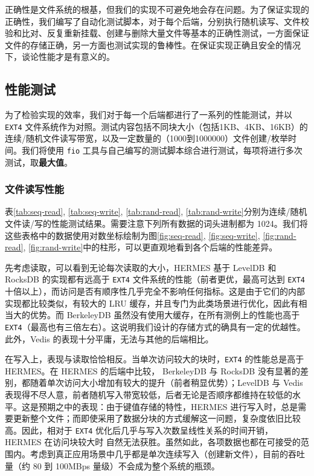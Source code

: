 \documentclass{ctexart}
\begin{document}
正确性是文件系统的根基，但我们的实现不可避免地会存在问题。为了保证实现的正确性，我们编写了自动化测试脚本，对于每个后端，分别执行随机读写、文件校验和比对、反复重新挂载、创建与删除大量文件等基本的正确性测试，一方面保证文件的存储正确，另一方面也测试实现的鲁棒性。在保证实现正确且安全的情况下，谈论性能才是有意义的。

\subsection{性能测试}

为了检验实现的效率，我们对于每一个后端都进行了一系列的性能测试，并以 \texttt{EXT4} 文件系统作为对照。测试内容包括不同块大小（包括1KB、4KB、16KB）的连续/随机文件读写带宽，以及一定数量的（1000到1000000）文件创建/枚举时间。我们将使用 \texttt{fio} 工具与自己编写的测试脚本综合进行测试，每项将进行多次测试，取\textbf{最大值}。

\subsubsection{文件读写性能}

表\ref{tab:seq-read}, \ref{tab:seq-write}, \ref{tab:rand-read}, \ref{tab:rand-write}分别为连续/随机文件读/写的性能测试结果。需要注意下列所有数据的词头进制都为 1024。我们将这些表格中的数据使用对数坐标绘制为图\ref{fig:seq-read}, \ref{fig:seq-write}, \ref{fig:rand-read}, \ref{fig:rand-write}中的柱形，可以更直观地看到各个后端的性能差异。

先考虑读取，可以看到无论每次读取的大小，HERMES 基于 LevelDB 和 RocksDB 的实现都有远高于 \texttt{EXT4} 文件系统的性能（前者更优，最高可达到 \texttt{EXT4} 十倍以上），而访问是否有顺序性几乎完全不影响任何指标。这是由于它们的内部实现都比较类似，有较大的 LRU 缓存，并且专门为此类场景进行优化，因此有相当大的优势。而 BerkeleyDB 虽然没有使用大缓存，在所有测例上的性能也高于 \texttt{EXT4}（最高也有三倍左右）。这说明我们设计的存储方式的确具有一定的优越性。此外，Vedis 的表现十分平庸，无法与其他的后端相比。

在写入上，表现与读取恰恰相反。当单次访问较大的块时，\texttt{EXT4} 的性能总是高于 HERMES。在 HERMES 的后端中比较， BerkeleyDB 与 RocksDB 没有显著的差别，都随着单次访问大小增加有较大的提升（前者稍显优势）；LevelDB 与 Vedis 表现得不尽人意，前者随机写入带宽较低，后者无论是否顺序都维持在较低的水平。这是预期之中的表现：由于键值存储的特性，HERMES 进行写入时，总是需要更新整个文件；而即使采用了数据分块的方式缓解这一问题，复杂度依旧比较高。因此，相对于 \texttt{EXT4} 优化后几乎与写入次数呈线性关系的时间开销，HERMES 在访问块较大时 自然无法获胜。虽然如此，各项数据也都在可接受的范围内。考虑到真正应用场景中几乎都是单次连续写入（创建新文件），目前的吞吐量（约 80 到 100MBps 量级）不会成为整个系统的瓶颈。
\end{document}
